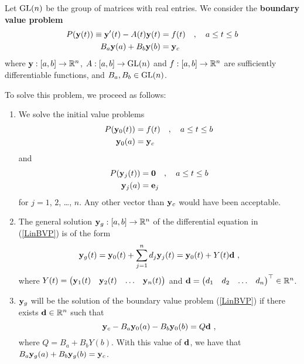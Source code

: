Let $\mathrm{GL}(n)$ be the group of \nn matrices with real entries.
We consider the
{\bfseries boundary value problem}
\begin{equation} \label{LinBVP}
\begin{split}
P(\mathbf{y}(t)) \equiv \mathbf{y}'(t) - A(t) \mathbf{y}(t) &= f(t)
\quad , \quad a \leq t \leq b  \\
B_a\mathbf{y}(a) + B_b\mathbf{y}(b) &= \mathbf{y}_c
\end{split}
\end{equation}
where $\mathbf{y} : [a,b] \rightarrow \mathbb{R}^n$,
$A:[a,b] \rightarrow \mathrm{GL}(n)$ and $f:[a,b]\rightarrow \mathbb{R}^n$
are sufficiently differentiable functions, and
$B_a, B_b \in \mathrm{GL}(n)$.

To solve this problem, we proceed as follows:

\begin{algo} \label{AlgoSimpleSM}
\begin{enumerate}
\item We solve the initial value problems
\begin{equation} \label{partS}
\begin{split}
P(\mathbf{y}_0(t)) &= f(t) \quad , \quad a \leq t \leq b \\
\mathbf{y}_0(a) &= \mathbf{y}_c
\end{split}
\end{equation}
and
\begin{equation} \label{genS}
\begin{split}
P(\mathbf{y}_j(t)) &= \mathbf{0} \quad , \quad a \leq t \leq b \\
\mathbf{y}_j(a) &= \mathbf{e}_j
\end{split}
\end{equation}
for $j=1$, $2$, \ldots, $n$.  Any other vector than $\mathbf{y}_c$ would
have been acceptable.
\item The general solution $\mathbf{y}_g:[a,b]\to \mathbb{R}^n$ of the
differential equation in (\ref{LinBVP}) is of the form
\[
\mathbf{y}_g(t) = \mathbf{y}_0(t) + \sum_{j=1}^n d_j \mathbf{y}_j(t) =
\mathbf{y}_0(t) + Y(t) \mathbf{d} \ ,
\]
where
$Y(t) = \begin{pmatrix}
\mathbf{y}_1(t) & \mathbf{y}_2(t) & \ldots & \mathbf{y}_n(t) \end{pmatrix}$
and $\mathbf{d} =
\begin{pmatrix} d_1 & d_2 & \ldots & d_n \end{pmatrix}^\top \in \mathbb{R}^n$.
\item $\mathbf{y}_g$ will be the solution of the boundary value
problem (\ref{LinBVP}) if there exists $\mathbf{d} \in \mathbb{R}^n$ such that
\begin{equation} \label{BVcond}
\mathbf{y}_c - B_a\mathbf{y}_0(a) - B_b\mathbf{y}_0(b) = Q\mathbf{d} \ ,
\end{equation}
where $Q = B_a + B_b Y(b)$.  With this value of $\mathbf{d}$, we have
that $B_a\mathbf{y}_g(a) + B_b\mathbf{y}_g(b) = \mathbf{y}_c$.  \label{ShootStep3}
\end{enumerate}
\end{algo}

